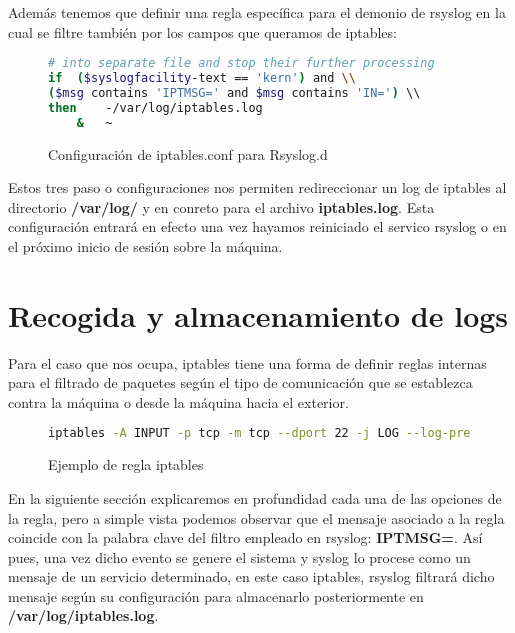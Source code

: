Además tenemos que definir una regla específica para el demonio de rsyslog en la cual se filtre también por los campos que queramos de iptables:

\begin{figure}[H]
\begin{lstlisting}[language=bash]
# into separate file and stop their further processing
if  ($syslogfacility-text == 'kern') and \\
($msg contains 'IPTMSG=' and $msg contains 'IN=') \\
then    -/var/log/iptables.log
    &   ~

\end{lstlisting}
\caption{Configuración de iptables.conf para Rsyslog.d}
\end{figure}

Estos tres paso o configuraciones nos permiten redireccionar un log de iptables al directorio \textbf{/var/log/} y en conreto para el archivo \textbf{iptables.log}. Esta configuración entrará en efecto una vez hayamos reiniciado el servico rsyslog o en el próximo inicio de sesión sobre la máquina.

\pagebreak
\section[Logs]{Recogida y almacenamiento de logs}
Para el caso que nos ocupa, iptables tiene una forma de definir reglas internas para el filtrado de paquetes según el tipo de comunicación que se establezca contra la máquina o desde la máquina hacia el exterior.

\begin{figure}[H]
\begin{lstlisting}[language=bash]
iptables -A INPUT -p tcp -m tcp --dport 22 -j LOG --log-prefix "IPTMSG=Connection SSH "
\end{lstlisting}
\caption{Ejemplo de regla iptables}
\end{figure}

En la siguiente sección explicaremos en profundidad cada una de las opciones de la regla, pero a simple vista podemos observar que el mensaje asociado a la regla coincide con la palabra clave del filtro empleado en rsyslog: \textbf{IPTMSG=}. Así pues, una vez dicho evento se genere el sistema y syslog lo procese como un mensaje de un servicio determinado, en este caso iptables, rsyslog filtrará dicho mensaje según su configuración para almacenarlo posteriormente en \textbf{/var/log/iptables.log}.

